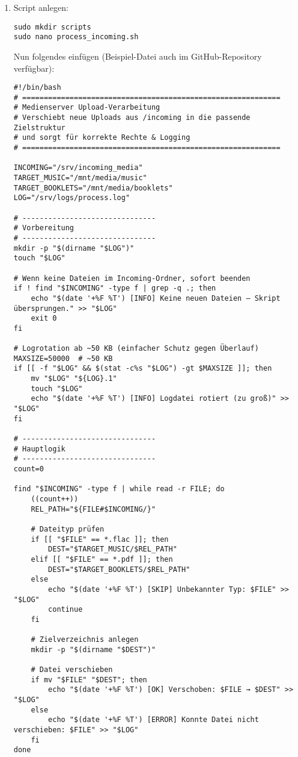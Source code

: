 \documentclass[12pt,a4paper]{report}
\begin{document}
  \begin{enumerate}
    \item Script anlegen:
    \begin{verbatim}
sudo mkdir scripts
sudo nano process_incoming.sh
    \end{verbatim}

    Nun folgendes einfügen (Beispiel-Datei auch im GitHub-Repository verfügbar):
    \begin{verbatim}
#!/bin/bash
# ============================================================
# Medienserver Upload-Verarbeitung
# Verschiebt neue Uploads aus /incoming in die passende Zielstruktur
# und sorgt für korrekte Rechte & Logging
# ============================================================

INCOMING="/srv/incoming_media"
TARGET_MUSIC="/mnt/media/music"
TARGET_BOOKLETS="/mnt/media/booklets"
LOG="/srv/logs/process.log"

# -------------------------------
# Vorbereitung
# -------------------------------
mkdir -p "$(dirname "$LOG")"
touch "$LOG"

# Wenn keine Dateien im Incoming-Ordner, sofort beenden
if ! find "$INCOMING" -type f | grep -q .; then
    echo "$(date '+%F %T') [INFO] Keine neuen Dateien – Skript übersprungen." >> "$LOG"
    exit 0
fi

# Logrotation ab ~50 KB (einfacher Schutz gegen Überlauf)
MAXSIZE=50000  # ~50 KB
if [[ -f "$LOG" && $(stat -c%s "$LOG") -gt $MAXSIZE ]]; then
    mv "$LOG" "${LOG}.1"
    touch "$LOG"
    echo "$(date '+%F %T') [INFO] Logdatei rotiert (zu groß)" >> "$LOG"
fi

# -------------------------------
# Hauptlogik
# -------------------------------
count=0

find "$INCOMING" -type f | while read -r FILE; do
    ((count++))
    REL_PATH="${FILE#$INCOMING/}"

    # Dateityp prüfen
    if [[ "$FILE" == *.flac ]]; then
        DEST="$TARGET_MUSIC/$REL_PATH"
    elif [[ "$FILE" == *.pdf ]]; then
        DEST="$TARGET_BOOKLETS/$REL_PATH"
    else
        echo "$(date '+%F %T') [SKIP] Unbekannter Typ: $FILE" >> "$LOG"
        continue
    fi

    # Zielverzeichnis anlegen
    mkdir -p "$(dirname "$DEST")"

    # Datei verschieben
    if mv "$FILE" "$DEST"; then
        echo "$(date '+%F %T') [OK] Verschoben: $FILE → $DEST" >> "$LOG"
    else
        echo "$(date '+%F %T') [ERROR] Konnte Datei nicht verschieben: $FILE" >> "$LOG"
    fi
done


\end{verbatim}
\end{enumerate}
\end{document}
